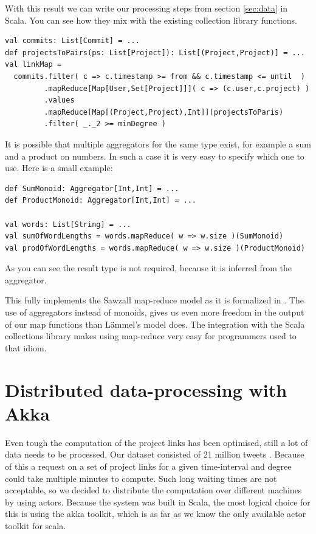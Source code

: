 \documentclass[10pt,a4paper]{article}
\begin{document}
With this result we can write our processing steps from section \ref{sec:data} in Scala. You can see how they mix with the existing collection library functions.
\begin{lstlisting}
val commits: List[Commit] = ...
def projectsToPairs(ps: List[Project]): List[(Project,Project)] = ...
val linkMap = 
  commits.filter( c => c.timestamp >= from && c.timestamp <= until  )
         .mapReduce[Map[User,Set[Project]]]( c => (c.user,c.project) )
         .values
         .mapReduce[Map[(Project,Project),Int]](projectsToParis)
         .filter( _._2 >= minDegree )
\end{lstlisting}

It is possible that multiple aggregators for the same type exist, for example a sum and a product on numbers. In such a case it is very easy to specify which one to use. Here is a small example:
\begin{lstlisting}
def SumMonoid: Aggregator[Int,Int] = ...
def ProductMonoid: Aggregator[Int,Int] = ...

val words: List[String] = ...
val sumOfWordLengths = words.mapReduce( w => w.size )(SumMonoid)
val prodOfWordLengths = words.mapReduce( w => w.size )(ProductMonoid)
\end{lstlisting}
As you can see the result type is not required, because it is inferred from the aggregator.

This fully implements the Sawzall map-reduce model as it is formalized in \cite{lammel2008google}. The use of aggregators instead of monoids, gives us even more freedom in the output of our map functions than L\"ammel's model does. The integration with the Scala collections library makes using map-reduce very easy for programmers used to that idiom.

\section{Distributed data-processing with Akka}\label{sec:distributed}

Even tough the computation of the project links has been optimised, still a lot of data needs to be processed. Our dataset consisted of 21 million tweets . Because of this a request on a set of project links for a given time-interval and degree could take multiple minutes to compute. Such long waiting times are not acceptable, so we decided to distribute the computation over different machines by using actors. Because the system was built in Scala, the most logical choice for this is using the akka toolkit, which is as far as we know the only available actor toolkit for scala.
\end{document}
